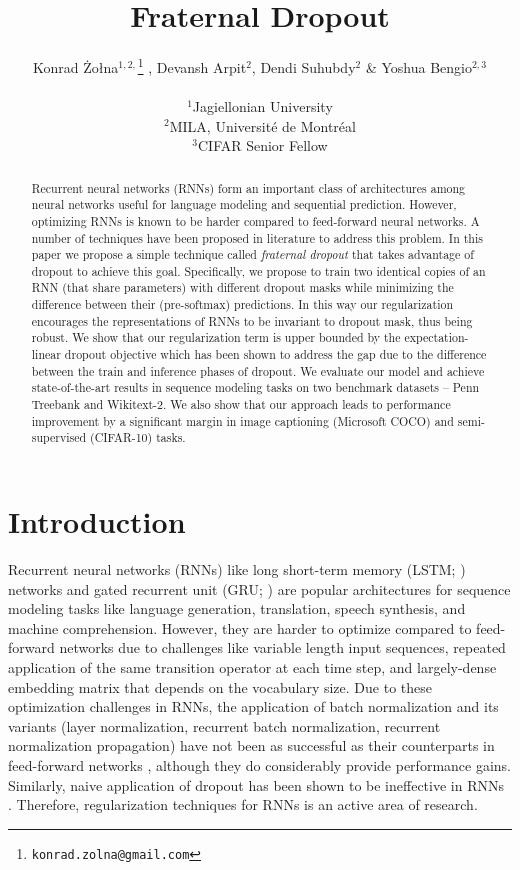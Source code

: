 \documentclass{article} %
\title{Fraternal Dropout}
\author{
Konrad \.Zo\l{}na$^{1,2,}$\thanks{\texttt{konrad.zolna@gmail.com}}  , Devansh Arpit$^2$, Dendi Suhubdy$^2$ \& Yoshua Bengio$^{2,3}$
\\\\
$^1$Jagiellonian University\\
$^2$MILA, Universit\'e de Montr\'eal\\
$^3$CIFAR Senior Fellow}
\begin{document}
\maketitle

\begin{abstract}
Recurrent neural networks (RNNs) form an important class of architectures among neural networks useful for language modeling and sequential prediction. However, optimizing RNNs is known to be harder compared to feed-forward neural networks. A number of techniques have been proposed in literature to address this problem. In this paper we propose a simple technique called \emph{fraternal dropout} that takes advantage of dropout to achieve this goal. Specifically, we propose to train two identical copies of an RNN (that share parameters) with different dropout masks while minimizing the difference between their (pre-softmax) predictions. In this way our regularization encourages the representations of RNNs to be invariant to dropout mask, thus being robust. We show that our regularization term is upper bounded by the expectation-linear dropout objective which has been shown to address the gap due to the difference between the train and inference phases of dropout. We evaluate our model and achieve state-of-the-art results in sequence modeling tasks on two benchmark datasets -- Penn Treebank and Wikitext-2. We also show that our approach leads to performance improvement by a significant margin in image captioning (Microsoft COCO) and semi-supervised (CIFAR-10) tasks.
\end{abstract}

\section{Introduction}
Recurrent neural networks (RNNs) like long short-term memory (LSTM; \cite{lstm}) networks and gated recurrent unit (GRU; \cite{gru}) are popular architectures for sequence modeling tasks like language generation, translation, speech synthesis, and machine comprehension. However, they are harder to optimize compared to feed-forward networks due to challenges like variable length input sequences, repeated application of the same transition operator at each time step, and largely-dense embedding matrix that depends on the vocabulary size. Due to these optimization challenges in RNNs, the application of batch normalization and its variants (layer normalization, recurrent batch normalization, recurrent normalization propagation) have not been as successful as their counterparts in feed-forward networks \citep{laurent2016batch}, although they do considerably provide performance gains. Similarly, naive application of dropout \citep{srivastava2014dropout} has been shown to be ineffective in RNNs \citep{zaremba2014recurrent}. Therefore, regularization techniques for RNNs is an active area of research.
\end{document}
